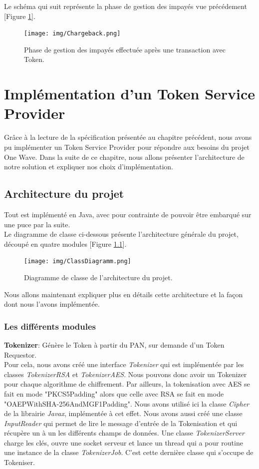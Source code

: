 \documentclass{report}
\begin{document}
\noindent
Le schéma qui suit représente la phase de gestion des impayés vue précédement [Figure \ref{Impayes}].

\begin{figure}[!ht]
    \centering
			\texttt{[image: img/Chargeback.png]}
			\caption{\label{Impayes} Phase de gestion des impayés effectuée après une transaction avec Token.}			
\end{figure}



\chapter{Implémentation d'un Token Service Provider}
Grâce à la lecture de la spécification présentée au chapitre précédent, nous avons pu implémenter un Token Service Provider pour répondre aux besoins du projet One Wave. Dans la suite de ce chapitre, nous allons présenter l'architecture de notre solution et expliquer nos choix d'implémentation.

\section{Architecture du projet}
Tout est implémenté en Java, avec pour contrainte de pouvoir être embarqué sur une puce par la suite.\\
Le diagramme de classe ci-dessous présente l'architecture générale du projet, découpé en quatre modules [Figure \ref{Architecture}].

\begin{figure}[!ht]
    \centering
			\texttt{[image: img/ClassDiagramm.png]}
			\caption{\label{Architecture} Diagramme de classe de l'architecture du projet.}			
\end{figure}

\noindent
Nous allons maintenant expliquer plus en détails cette architecture et la façon dont nous l'avons implémentée.

\newpage
\subsection{Les différents modules}
\noindent
\textbf{Tokenizer}: Génère le Token à partir du PAN, sur demande d'un Token Requestor.\\

\noindent
Pour cela, nous avons créé une interface \textit{Tokenizer} qui est implémentée par les classes \textit{TokenizerRSA} et \textit{TokenizerAES}. Nous pouvons donc avoir un Tokenizer pour chaque algorithme de chiffrement. Par ailleurs, la tokenisation avec AES se fait en mode "PKCS5Padding" alors que celle avec RSA se fait en mode "OAEPWithSHA-256AndMGF1Padding". Nous avons utilisé ici la classe \textit{Cipher} de la librairie \textit{Javax}, implémentée à cet effet. Nous avons aussi créé une classe \textit{InputReader} qui permet de lire le message d'entrée de la Tokenisation et qui récupère un à un les différents champs de données. Une classe \textit{TokenizerServer} charge les clés, ouvre une socket serveur et lance un thread qui a pour routine une instance de la classe \textit{TokenizerJob}. C'est cette dernière classe qui s'occupe de Tokeniser.\\
\end{document}
